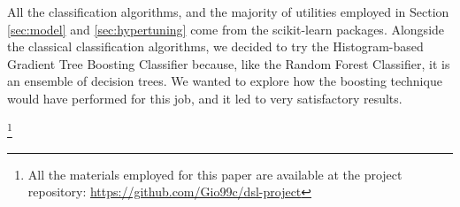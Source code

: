 \documentclass[conference]{IEEEtran}
\begin{document}
All the classification algorithms, and the majority of utilities employed in Section \ref{sec:model} and \ref{sec:hypertuning} come from the scikit-learn packages\cite{scikit-learn}. Alongside the classical classification algorithms, we decided to try the Histogram-based Gradient Tree Boosting Classifier because, like the Random Forest Classifier, it is an ensemble of decision trees. We wanted to explore how the boosting technique would have performed for this job, and it led to very satisfactory results.

\footnote{All the materials employed for this paper are available at the project repository: \url{https://github.com/Gio99c/dsl-project}}
\end{document}
